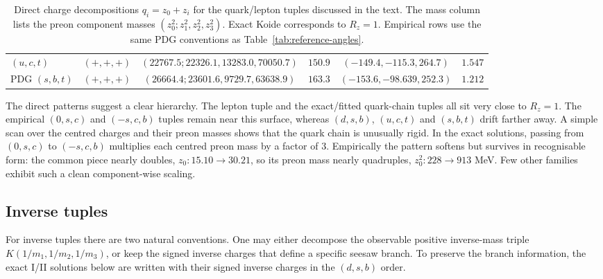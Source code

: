 \documentclass[11pt]{article}
\begin{document}
\begin{table}[h]
\begin{tabular}{@{}l c c c c c@{}}
$(u,c,t)$ & $(+,+,+)$ & $(22767.5;22326.1,13283.0,70050.7)$ & $150.9$ & $(-149.4,-115.3,264.7)$ & $1.547$ \\
PDG $(s,b,t)$ & $(+,+,+)$ & $(26664.4;23601.6,9729.7,63638.9)$ & $163.3$ & $(-153.6,-98.639,252.3)$ & $1.212$ \\
\bottomrule
\end{tabular}
\caption{Direct charge decompositions $q_i = z_0 + z_i$ for the quark/lepton
  tuples discussed in the text.  The mass column lists the preon component masses
  $(z_0^2; z_1^2,z_2^2,z_3^2)$.  Exact Koide corresponds to $R_z=1$.
  Empirical rows use the same PDG conventions as
  Table~\ref{tab:reference-angles}.}
\end{table}

The direct patterns suggest a clear hierarchy.  The lepton tuple and the
exact/fitted quark-chain tuples all sit very close to $R_z=1$.
The empirical $(0,s,c)$ and $(-s,c,b)$ tuples remain near this surface,
whereas $(d,s,b)$, $(u,c,t)$ and $(s,b,t)$ drift farther away.
A simple scan over the centred charges and their preon masses shows that the
quark chain is unusually rigid.  In the exact solutions, passing from
$(0,s,c)$ to $(-s,c,b)$ multiplies each centred preon mass by a factor of
$3$.  Empirically the pattern softens but survives in recognisable form:
the common piece nearly doubles, $z_0:15.10\to 30.21$, so its preon mass
nearly quadruples, $z_0^2:228\to 913$ MeV.  Few other families exhibit such
a clean component-wise scaling.

\subsection{Inverse tuples}

For inverse tuples there are two natural conventions.  One may either
decompose the observable positive inverse-mass triple
$K(1/m_1,1/m_2,1/m_3)$, or keep the signed inverse charges that define a
specific seesaw branch.  To preserve the branch information, the exact
I/II solutions below are written with their signed inverse charges in the
$(d,s,b)$ order.
\end{document}

